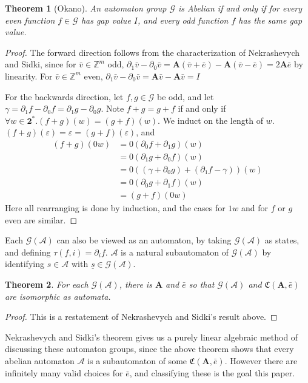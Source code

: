 \documentclass{article}
\newcommand{\A}{\mathcal{A}}
\newcommand{\G}{\mathcal{G}}
\newcommand{\C}{\mathfrak{C}(\Am,\e)}
\newcommand{\Z}{\mathbb{Z}}
\newcommand{\2}{\textbf{2}}
\newcommand{\Am}{\textbf{A}}
\newcommand{\del}{\partial}
\newcommand{\vv}{\bar{v}}
\newcommand{\e}{\bar{e}}
\newtheorem{thm}{Theorem}
\theoremstyle{definition}
\begin{document}
\begin{thm}[Okano]
  An automaton group $\G$ is Abelian if and only if for every even function
  $f \in \G$ has gap value $I$, and every odd function $f$ has the same 
  gap value.
\end{thm}

\begin{proof}
  The forward direction follows from the characterization of Nekrashevych
  and Sidki, since for $\vv \in \Z^m$ odd, 
  $\del_1 \vv - \del_0 \vv = \Am (\vv + \e) - \Am (\vv - \e) = 2 \Am \e$
  by linearity. For $\vv \in \Z^m$ even, 
  $\del_1 \vv - \del_0 \vv = \Am \vv - \Am \vv = I$

  For the backwards direction, let $f,g \in \G$ be odd, and let 
  $\gamma = \del_1 f - \del_0 f = \del_1 g - \del_0 g$.
  Note $f+g = g+f$ if and only if $\forall w \in \2^*. (f+g)(w) = (g+f)(w)$.
  We induct on the length of $w$.  
  $(f+g)(\varepsilon) = \varepsilon = (g+f)(\varepsilon)$, and 
  \begin{align*}
    (f+g)(0w) &= 0(\del_0 f + \del_1 g)(w)\\
              &= 0(\del_1 g + \del_0 f)(w)\\
              &= 0((\gamma + \del_0 g) + (\del_1 f - \gamma))(w)\\
              &= 0(\del_0 g + \del_1 f)(w)\\
              &= (g+f)(0w)
  \end{align*}
  Here all rearranging is done by induction, and the cases for $1w$ and for
  $f$ or $g$ even are similar.
\end{proof}

Each $\G(\A)$ can also be viewed as an automaton, by taking $\G(\A)$ 
as states, and defining $\tau(f,i) = \del_i f$. $\A$ is a natural subautomaton
of $\G(\A)$ by identifying $s \in \A$ with $\underline{s} \in \G(\A)$.

\begin{thm}
  For each $\G(\A)$, there is $\Am$ and $\e$ so that 
  $\G(\A)$ and $\C$ are isomorphic as automata.
\end{thm}

\begin{proof}
  This is a restatement of Nekrashevych and Sidki's result above.
\end{proof}

Nekrashevych and Sidki's theorem gives us a purely linear algebraic method
of discussing these automaton groups, since the above theorem shows that
every abelian automaton $\A$ is a subautomaton of some $\C$. 
However there are infinitely many valid choices for $\e$, and classifying 
these is the goal this paper. 
\end{document}
